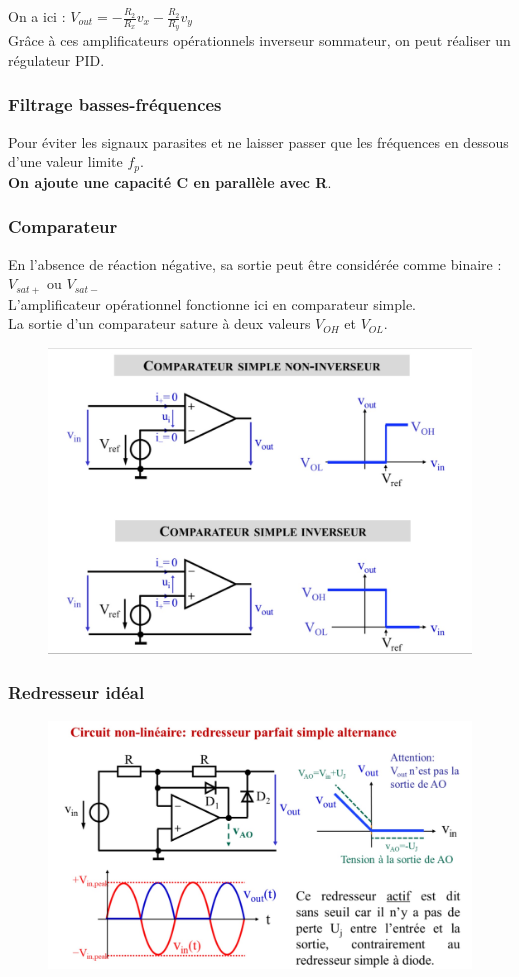 \documentclass[../main.tex]{subfiles}
\begin{document}
On a ici : $V_{out} = -\frac{R_2}{R_x}v_x - \frac{R_2}{R_y}v_y$\\


Grâce à ces amplificateurs opérationnels inverseur sommateur, on peut réaliser un régulateur PID.\\

\subsubsection{Filtrage basses-fréquences}
Pour éviter les signaux parasites et ne laisser passer que les fréquences en dessous d'une valeur limite $f_p$.\\
\textbf{On ajoute une capacité C en parallèle avec R}.\\

\subsubsection{Comparateur}

En l'absence de réaction négative, sa sortie peut être considérée comme binaire : $V_{sat+}$ ou $V_{sat-}$\\

L'amplificateur opérationnel fonctionne ici en comparateur simple.\\
La sortie d'un comparateur sature à deux valeurs $V_{OH}$ et $V_{OL}$.\\

\begin{figure}[hbt!]
    \centering
    \includegraphics[width=.6\textwidth]{IMAGES/elec/IMG_0137.jpeg}
\end{figure}

\subsubsection{Redresseur idéal}

\begin{figure}[hbt!]
    \centering
    \includegraphics[width=.6\textwidth]{IMAGES/elec/IMG_0138.jpeg}
\end{figure}
\end{document}
